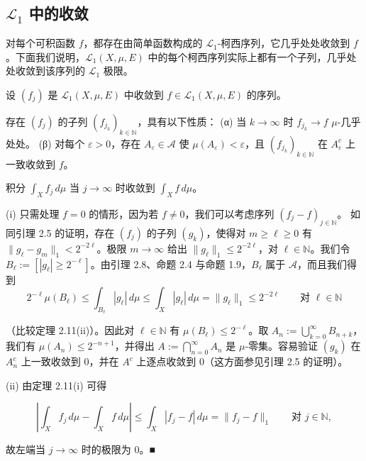 \subsection*{$ \mathcal{L}_1 $ 中的收敛}

对每个可积函数 $ f $，都存在由简单函数构成的 $ \mathcal{L}_1 $-柯西序列，它几乎处处收敛到 $ f $。下面我们说明，$ \mathcal{L}_1(X,\mu,E) $ 中的每个柯西序列实际上都有一个子列，几乎处处收敛到该序列的 $ \mathcal{L}_1 $ 极限。

\begin{theorem}

设 $ (f_j) $ 是 $ \mathcal{L}_1(X,\mu,E) $ 中收敛到 $ f \in \mathcal{L}_1(X,\mu,E) $ 的序列。

\begin{subitems}
\item

存在 $ (f_j) $ 的子列 $ (f_{j_k})_{k \in \mathbb{N}} $，具有以下性质：
(α) 当 $ k \to \infty $ 时 $ f_{j_k} \to f $ $ \mu $-几乎处处。
(β) 对每个 $ \varepsilon > 0 $，存在 $ A_\varepsilon \in \mathcal{A} $ 使 $ \mu(A_\varepsilon) < \varepsilon $，且 $ (f_{j_k})_{k \in \mathbb{N}} $ 在 $ A_\varepsilon^c $ 上一致收敛到 $ f $。

\item

积分 $ \int_X f_j \, d\mu $ 当 $ j \to \infty $ 时收敛到 $ \int_X f \, d\mu $。

\proofhead
(i) 只需处理 $ f = 0 $ 的情形，因为若 $ f \ne 0 $，我们可以考虑序列 $ (f_j - f)_{j \in \mathbb{N}} $。
如同引理 2.5 的证明，存在 $ (f_j) $ 的子列 $ (g_k) $，使得对 $ m \ge \ell \ge 0 $ 有 $ \|g_\ell - g_m\|_1 < 2^{-2\ell} $。极限 $ m \to \infty $ 给出 $ \|g_\ell\|_1 \le 2^{-2\ell} $，对 $ \ell \in \mathbb{N} $。我们令 $ B_\ell := [|g_\ell| \ge 2^{-\ell}] $。由引理 2.8、命题 2.4 与命题 1.9，$ B_\ell $ 属于 $ \mathcal{A} $，而且我们得到
\[
2^{-\ell} \mu(B_\ell) \le \int_{B_\ell} |g_\ell| \, d\mu \le \int_X |g_\ell| \, d\mu = \|g_\ell\|_1 \le 2^{-2\ell} \qquad \text{对 } \ell \in \mathbb{N}
\]

（比较定理 2.11(ii)）。因此对 $ \ell \in \mathbb{N} $ 有 $ \mu(B_\ell) \le 2^{-\ell} $。取 $ A_n := \bigcup_{k=0}^{\infty} B_{n+k} $，我们有 $ \mu(A_n) \le 2^{-n+1} $，并得出 $ A := \bigcap_{n=0}^{\infty} A_n $ 是 $ \mu $-零集。容易验证 $ (g_k) $ 在 $ A_n^c $ 上一致收敛到 0，并在 $ A^c $ 上逐点收敛到 0（这方面参见引理 2.5 的证明）。

\end{subitems}

(ii) 由定理 2.11(i) 可得

\[
\left| \int_X f_j \, d\mu - \int_X f \, d\mu \right| \le \int_X |f_j - f| \, d\mu = \|f_j - f\|_1 \qquad \text{对 } j \in \mathbb{N} ,
\]

故左端当 $ j \to \infty $ 时的极限为 0。\nobreak\hspace{0.35em}■

\end{theorem}

